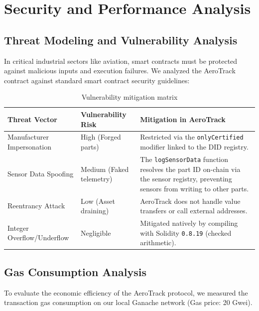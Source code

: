 \documentclass[12pt,a4paper]{article}
\begin{document}
\section{Security and Performance Analysis}

\subsection{Threat Modeling and Vulnerability Analysis}

In critical industrial sectors like aviation, smart contracts must be protected against malicious inputs and execution failures. We analyzed the AeroTrack contract against standard smart contract security guidelines:

\begin{table}[H]
\centering
\begin{tabularx}{\textwidth}{lXX}
\toprule
\textbf{Threat Vector} & \textbf{Vulnerability Risk} & \textbf{Mitigation in AeroTrack} \\
\midrule
Manufacturer Impersonation & High (Forged parts) & Restricted via the \texttt{onlyCertified} modifier linked to the DID registry. \\
Sensor Data Spoofing & Medium (Faked telemetry) & The \texttt{logSensorData} function resolves the part ID on-chain via the sensor registry, preventing sensors from writing to other parts. \\
Reentrancy Attack & Low (Asset draining) & AeroTrack does not handle value transfers or call external addresses. \\
Integer Overflow/Underflow & Negligible & Mitigated natively by compiling with Solidity \texttt{0.8.19} (checked arithmetic). \\
\bottomrule
\end{tabularx}
\caption{Vulnerability mitigation matrix}
\label{tab:threat-model}
\end{table}

\subsection{Gas Consumption Analysis}

To evaluate the economic efficiency of the AeroTrack protocol, we measured the transaction gas consumption on our local Ganache network (Gas price: 20 Gwei). 
\end{document}
